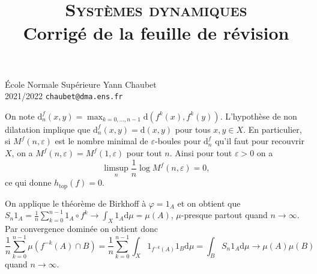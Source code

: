 \documentclass[a4paper,10pt,openany]{article}
\title{\textsc{Syst\`emes dynamiques} \\ Corrig\'e de la feuille de r\'evision}
\date{}
\author{}
\theoremstyle{plain}
\theoremstyle{definition}
\newcommand{\dd}{\mathrm{d}}
\begin{document}
{\noindent \'Ecole Normale Sup\'erieure  \hfill Yann Chaubet } \\
{2021/2022 \hfill \texttt{chaubet@dma.ens.fr}}

{\let\newpage\relax\maketitle}
\maketitle

 \vspace{1.5mm} 

\noindent
On note $\dd^f_n(x,y) = \max_{k = 0, \dots, n-1} \dd (f^k(x), f^k(y)).$ L'hypoth\`ese de non dilatation implique que
$
\dd^f_n(x,y) = \dd(x,y)
$
pour tous $x,y \in X$. En particulier, si $M^f(n,\varepsilon)$ est le nombre minimal de $\varepsilon$-boules pour $\dd^f_n$ qu'il faut pour recouvrir $X$, on a $M^f(n,\varepsilon) = M^f(1, \varepsilon)$ pour tout $n$. Ainsi pour tout $\varepsilon > 0$ on a
$$
\limsup_n \frac{1}{n} \log M^f(n, \varepsilon) = 0,
$$
ce qui donne $h_\mathrm{top}(f) = 0.$
\vspace{0.6cm}

 \vspace{1.5mm} 

\noindent
On applique le th\'eor\`eme de Birkhoff \`a $\varphi = 1_A$ et on obtient que $S_n 1_A = \frac{1}{n} \sum_{k=0}^{n-1} 1_A \circ f^k \to \int_X 1_A \dd \mu = \mu(A)$, $\mu$-presque partout quand $n \to \infty.$ Par convergence domin\'ee on obtient donc
$$
\frac{1}{n} \sum_{k = 0}^{n-1} \mu\left(f^{-k}(A) \cap B\right) =\frac{1}{n} \sum_{k = 0}^{n-1} \int_X 1_{f^{-k}(A)} 1_B \dd \mu = \int_B S_n1_A \dd \mu \longrightarrow \mu(A) \mu(B)
$$
quand $n \to \infty$. 
\vspace{0.6cm}

 \vspace{1.5mm} 
\end{document}
